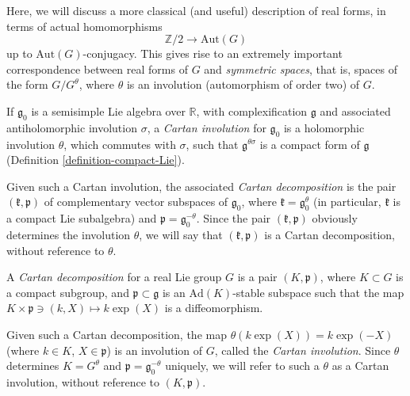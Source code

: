 Here, we will discuss a more classical (and useful) description of real forms, in terms of actual homomorphisms 
$$ \mathbb Z/2 \to \text{Aut}(G)$$
up to $\text{Aut}(G)$-conjugacy. This gives rise to an extremely important correspondence between real forms of $G$ and \emph{symmetric spaces}, that is, spaces of the form $G/G^\theta$, where $\theta$ is an involution (automorphism of order two) of $G$. 




\begin{definition}
 \label{definition-Cartan-decomposition-involution} 
If $\mathfrak g_0$ is a semisimple Lie algebra over $\mathbb R$, with complexification $\mathfrak g$ and associated antiholomorphic involution $\sigma$, a {\it Cartan involution} for $\mathfrak g_0$ is a holomorphic involution $\theta$, which commutes with $\sigma$, such that $\mathfrak g^{\theta\sigma}$ is a compact form of $\mathfrak g$ (Definition \ref{definition-compact-Lie}). 
 
Given such a Cartan involution, the associated {\it Cartan decomposition} is the pair $(\mathfrak k,\mathfrak p)$ of complementary vector subspaces of $\mathfrak g_0$, where $\mathfrak k = \mathfrak g_0^\theta$ (in particular, $\mathfrak k$ is a compact Lie subalgebra) and $\mathfrak p = \mathfrak g_0^{-\theta}$. Since the pair $(\mathfrak k,\mathfrak p)$ obviously determines the involution $\theta$, we will say that $(\mathfrak k,\mathfrak p)$ is a Cartan decomposition, without reference to $\theta$. 
 
A {\it Cartan decomposition} for a real Lie group $G$ is a pair $(K,\mathfrak p)$, where $K\subset G$ is a compact subgroup, and $\mathfrak p\subset\mathfrak g$ is an $\text{Ad}(K)$-stable subspace such that the map $K\times \mathfrak p \ni (k,X)\mapsto k\exp(X)$ is a diffeomorphism.

Given such a Cartan decomposition, the map $\theta(k \exp(X)) = k \exp(-X)$ (where $k\in K$, $X\in\mathfrak p$) is an involution of $G$, called the {\it Cartan involution}. Since $\theta$ determines $K = G^\theta$ and $\mathfrak p = \mathfrak g_0^{-\theta}$ uniquely, we will refer to such a $\theta$ as a Cartan involution, without reference to $(K,\mathfrak p)$.
\end{definition}


